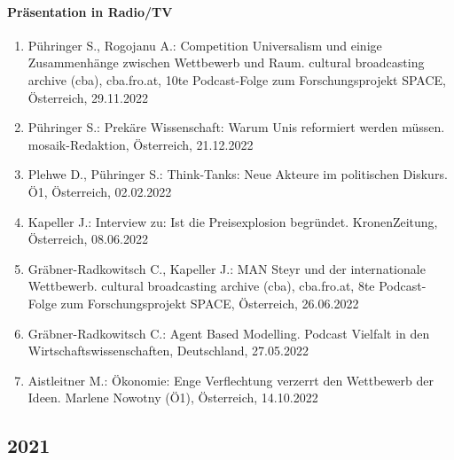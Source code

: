 \paragraph{Präsentation in Radio/TV}
\begin{enumerate}
	\item Pühringer S., Rogojanu A.: Competition Universalism und einige Zusammenhänge zwischen Wettbewerb und Raum. cultural broadcasting archive (cba), cba.fro.at, 10te Podcast-Folge zum Forschungsprojekt SPACE, Österreich, 29.11.2022
	\item Pühringer S.: Prekäre Wissenschaft: Warum Unis reformiert werden müssen. mosaik-Redaktion, Österreich, 21.12.2022
	\item Plehwe D., Pühringer S.: Think-Tanks: Neue Akteure im politischen Diskurs. Ö1, Österreich, 02.02.2022
	\item Kapeller J.: Interview zu: Ist die Preisexplosion begründet. KronenZeitung, Österreich, 08.06.2022
	\item Gräbner-Radkowitsch C., Kapeller J.: MAN Steyr und der internationale Wettbewerb. cultural broadcasting archive (cba), cba.fro.at, 8te Podcast-Folge zum Forschungsprojekt SPACE, Österreich, 26.06.2022
	\item Gräbner-Radkowitsch C.: Agent Based Modelling. Podcast Vielfalt in den Wirtschaftswissenschaften, Deutschland, 27.05.2022
	\item Aistleitner M.: Ökonomie: Enge Verflechtung verzerrt den Wettbewerb der Ideen. Marlene Nowotny (Ö1), Österreich, 14.10.2022
\end{enumerate}
\subsection*{2021}
